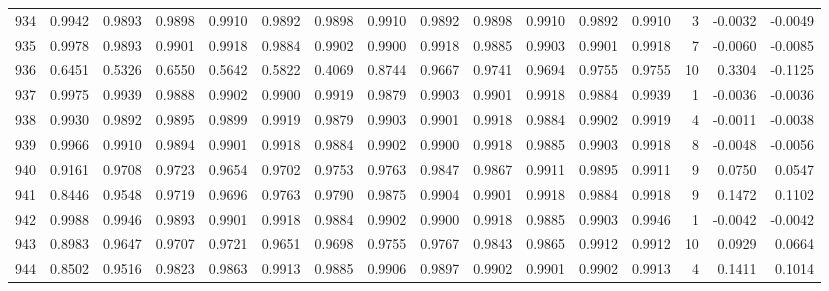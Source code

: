 \begin{tabular}{lrrrrrrrrrrrrrrr}
934 &      0.9942 &  0.9893 &  0.9898 &  0.9910 &  0.9892 &  0.9898 &  0.9910 &  0.9892 &  0.9898 &  0.9910 &   0.9892 &     0.9910 &      3 &                   -0.0032 &                    -0.0049 \\
935 &      0.9978 &  0.9893 &  0.9901 &  0.9918 &  0.9884 &  0.9902 &  0.9900 &  0.9918 &  0.9885 &  0.9903 &   0.9901 &     0.9918 &      7 &                   -0.0060 &                    -0.0085 \\
936 &      0.6451 &  0.5326 &  0.6550 &  0.5642 &  0.5822 &  0.4069 &  0.8744 &  0.9667 &  0.9741 &  0.9694 &   0.9755 &     0.9755 &     10 &                    0.3304 &                    -0.1125 \\
937 &      0.9975 &  0.9939 &  0.9888 &  0.9902 &  0.9900 &  0.9919 &  0.9879 &  0.9903 &  0.9901 &  0.9918 &   0.9884 &     0.9939 &      1 &                   -0.0036 &                    -0.0036 \\
938 &      0.9930 &  0.9892 &  0.9895 &  0.9899 &  0.9919 &  0.9879 &  0.9903 &  0.9901 &  0.9918 &  0.9884 &   0.9902 &     0.9919 &      4 &                   -0.0011 &                    -0.0038 \\
939 &      0.9966 &  0.9910 &  0.9894 &  0.9901 &  0.9918 &  0.9884 &  0.9902 &  0.9900 &  0.9918 &  0.9885 &   0.9903 &     0.9918 &      8 &                   -0.0048 &                    -0.0056 \\
940 &      0.9161 &  0.9708 &  0.9723 &  0.9654 &  0.9702 &  0.9753 &  0.9763 &  0.9847 &  0.9867 &  0.9911 &   0.9895 &     0.9911 &      9 &                    0.0750 &                     0.0547 \\
941 &      0.8446 &  0.9548 &  0.9719 &  0.9696 &  0.9763 &  0.9790 &  0.9875 &  0.9904 &  0.9901 &  0.9918 &   0.9884 &     0.9918 &      9 &                    0.1472 &                     0.1102 \\
942 &      0.9988 &  0.9946 &  0.9893 &  0.9901 &  0.9918 &  0.9884 &  0.9902 &  0.9900 &  0.9918 &  0.9885 &   0.9903 &     0.9946 &      1 &                   -0.0042 &                    -0.0042 \\
943 &      0.8983 &  0.9647 &  0.9707 &  0.9721 &  0.9651 &  0.9698 &  0.9755 &  0.9767 &  0.9843 &  0.9865 &   0.9912 &     0.9912 &     10 &                    0.0929 &                     0.0664 \\
944 &      0.8502 &  0.9516 &  0.9823 &  0.9863 &  0.9913 &  0.9885 &  0.9906 &  0.9897 &  0.9902 &  0.9901 &   0.9902 &     0.9913 &      4 &                    0.1411 &                     0.1014 \\

\end{tabular}
